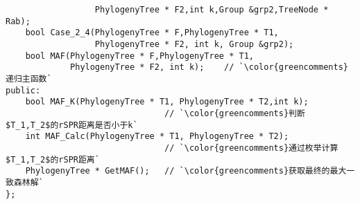 \begin{CJK}{UTF8}{gbsn}
\begin{lstlisting}
                  PhylogenyTree * F2,int k,Group &grp2,TreeNode * Rab);
    bool Case_2_4(PhylogenyTree * F,PhylogenyTree * T1,
                  PhylogenyTree * F2, int k, Group &grp2);
    bool MAF(PhylogenyTree * F,PhylogenyTree * T1,
             PhylogenyTree * F2, int k);    // `\color{greencomments}递归主函数`
public:
    bool MAF_K(PhylogenyTree * T1, PhylogenyTree * T2,int k); 
                                // `\color{greencomments}判断$T_1,T_2$的rSPR距离是否小于k`
    int MAF_Calc(PhylogenyTree * T1, PhylogenyTree * T2);
                                // `\color{greencomments}通过枚举计算$T_1,T_2$的rSPR距离`
    PhylogenyTree * GetMAF();   // `\color{greencomments}获取最终的最大一致森林解`
};
\end{lstlisting}
\end{CJK}















